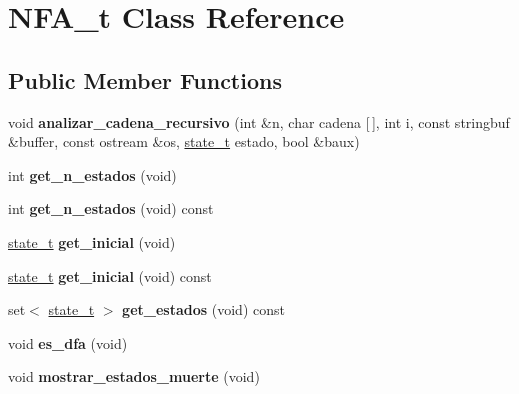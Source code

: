 \hypertarget{classNFA__t}{}\section{N\+F\+A\+\_\+t Class Reference}
\label{classNFA__t}
\subsection*{Public Member Functions}
\begin{DoxyCompactItemize}
\item 
\hypertarget{classNFA__t_a2f8bf858f128458c4a28956e12458183}{}\label{classNFA__t_a2f8bf858f128458c4a28956e12458183} 
void {\bfseries analizar\+\_\+cadena\+\_\+recursivo} (int \&n, char cadena \mbox{[}$\,$\mbox{]}, int i, const stringbuf \&buffer, const ostream \&os, \hyperlink{classstate__t}{state\+\_\+t} estado, bool \&baux)
\item 
\hypertarget{classNFA__t_adcfb5e5a283c3a872877f6588fc13ccb}{}\label{classNFA__t_adcfb5e5a283c3a872877f6588fc13ccb} 
int {\bfseries get\+\_\+n\+\_\+estados} (void)
\item 
\hypertarget{classNFA__t_a48c2682e8ea29417d4d2f63c89fdcaef}{}\label{classNFA__t_a48c2682e8ea29417d4d2f63c89fdcaef} 
int {\bfseries get\+\_\+n\+\_\+estados} (void) const
\item 
\hypertarget{classNFA__t_a08f1ef6479baa78b21a94be3d41a44fd}{}\label{classNFA__t_a08f1ef6479baa78b21a94be3d41a44fd} 
\hyperlink{classstate__t}{state\+\_\+t} {\bfseries get\+\_\+inicial} (void)
\item 
\hypertarget{classNFA__t_aa618a269e951d504842ca7d753c99fea}{}\label{classNFA__t_aa618a269e951d504842ca7d753c99fea} 
\hyperlink{classstate__t}{state\+\_\+t} {\bfseries get\+\_\+inicial} (void) const
\item 
\hypertarget{classNFA__t_a81b226e6539182e9d33e8d6c2e31d025}{}\label{classNFA__t_a81b226e6539182e9d33e8d6c2e31d025} 
set$<$ \hyperlink{classstate__t}{state\+\_\+t} $>$ {\bfseries get\+\_\+estados} (void) const
\item 
\hypertarget{classNFA__t_ad2aa1ba902dac7802d34f8f17c0cc09c}{}\label{classNFA__t_ad2aa1ba902dac7802d34f8f17c0cc09c} 
void {\bfseries es\+\_\+dfa} (void)
\item 
\hypertarget{classNFA__t_a4b4c7da8cdd665b15465015dc4a23fae}{}\label{classNFA__t_a4b4c7da8cdd665b15465015dc4a23fae} 
void {\bfseries mostrar\+\_\+estados\+\_\+muerte} (void)
\item 
\hypertarget{classNFA__t_ae4dad2c8e9c66efe6365fb911264242a}{}\label{classNFA__t_ae4dad2c8e9c66efe6365fb911264242a} 

\end{DoxyCompactItemize}
